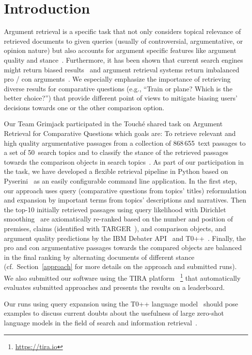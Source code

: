 
\section{Introduction}\label{intro}

Argument retrieval is a specific task that not only considers topical relevance of retrieved documents to given queries (usually of controversial, argumentative, or opinion nature) but also accounts for argument specific features like argument quality and stance~\cite{BondarenkoFBGAPBSWPH2020, BondarenkoGFBAPBSWPH2021}.  
Furthermore, it has been shown that current search engines might return biased results~\cite{ShahB2022} and argument retrieval systems return imbalanced pro / con arguments~\cite{CherumanalSSC2021}.
We especially emphasize the importance of retrieving diverse results for comparative questions (e.g., ``Train or plane? Which is the better choice?'') that provide different point of views to mitigate biasing users' decisions towards one or the other comparison option.

Our Team Grimjack participated in the Touch{\'e} shared task on Argument Retrieval for Comparative Questions which goals are: \Ni To retrieve relevant and high quality argumentative passages from a collection of 868\,655~text passages to a set of 50~search topics and \Nii to classify the stance of the retrieved passages towards the comparison objects in search topics~\cite{BondarenkoFKSGBPBSWPH2022}.
As part of our participation in the task, we have developed a flexible retrieval pipeline in Python based on Pyserini~\cite{LinMLYPN2021} as an easily configurable command line application.
In the first step, our approach uses query (comparative questions from topics' titles) reformulation and expansion by important terms from topics' descriptions and narratives. Then the top-10 initially retrieved passages using query likelihood with Dirichlet smoothing~\cite{ZhaiL2001} are axiomatically re-ranked based on the number and position of premises, claims (identified with TARGER~\cite{ChernodubOHBHBP2019}), and comparison objects, and argument quality predictions by the IBM Debater API~\cite{ToledoGCFVLJAS2019} and T0++~\cite{SanhWRBSACSLRDBXTSSKCNDCJWMSYPBWNRSSFFTBGBWR2021}.
Finally, the pro and con argumentative passages towards the compared objects are balanced in the final ranking by alternating documents of different stance (cf.\ Section~\ref{approach} for more details on the approach and submitted runs). We also submitted our software using the TIRA platform~\cite{PotthastGWS2019}%
\footnote{\url{https://tira.io}} that automatically evaluates submitted approaches and presents the results on a leaderboard.%

Our runs using query expansion using the T0++ language model~\cite{SanhWRBSACSLRDBXTSSKCNDCJWMSYPBWNRSSFFTBGBWR2021} should pose examples to discuss current doubts about the usefulness of large zero-shot language models in the field of search and information retrieval~\cite{ShahB2022}.
